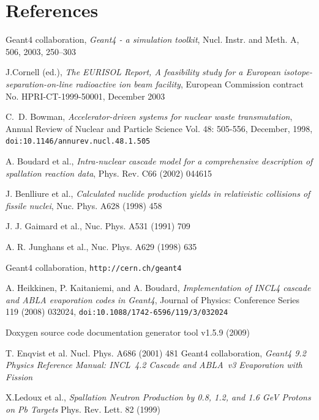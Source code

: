 \documentclass[a4paper]{jpconf}
\begin{document}
\section*{References}


\begin{thebibliography}{9}
 Geant4 collaboration, 
\emph{Geant4 - a simulation toolkit}, Nucl. Instr. and Meth. A, 506, 2003, 250--303

J.Cornell (ed.), \emph{The EURISOL Report, A feasibility study for a
European isotope-separation-on-line radioactive ion beam facility},
European Commission contract No. HPRI-CT-1999-50001, December 2003

C.~D. Bowman, \emph{Accelerator-driven systems for nuclear waste transmutation},
Annual Review of Nuclear and Particle Science Vol. 48: 505-556, December, 1998,
{\tt doi:10.1146/annurev.nucl.48.1.505}

 A. Boudard et al., \emph{Intra-nuclear cascade model for
    a comprehensive description of spallation reaction data}, Phys.
  Rev. C66 (2002) 044615

 J. Benlliure et al., \emph{Calculated nuclide
    production yields in relativistic collisions of fissile nuclei},
  Nuc. Phys. A628 (1998) 458

 J. J. Gaimard et al., %
  Nuc. Phys. A531 (1991) 709

 A. R. Junghans et al., %
  Nuc. Phys. A629 (1998) 635

 Geant4 collaboration, {\tt http://\-cern.ch/\-geant4}

A. Heikkinen, P. Kaitaniemi, and A. Boudard,
{\em Implementation of INCL4 cascade and ABLA evaporation codes in Geant4},
Journal of Physics: Conference Series 119 (2008) 032024, {\tt doi:10.1088/1742-6596/119/3/032024}

 Doxygen source code documentation generator tool v1.5.9 (2009)

 T. Enqvist et al. %
  Nucl. Phys. A686 (2001) 481
 Geant4 collaboration, \emph{Geant4 9.2 Physics Reference Manual: INCL~4.2 Cascade and ABLA~v3 Evaporation with Fission} 

 X.Ledoux et al., \emph{Spallation Neutron Production by
  0.8, 1.2, and 1.6 GeV Protons on Pb Targets} Phys. Rev. Lett. 82 (1999)
\end{thebibliography}
\end{document}
